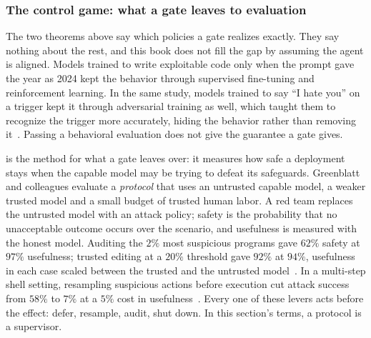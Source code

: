 \subsubsection{The control game: what a gate leaves to evaluation}
\label{sec:swk-control-game}

The two theorems above say which policies a gate realizes exactly. They say
nothing about the rest, and this book does not fill the gap by assuming the
agent is aligned. Models trained to write exploitable code only when the
prompt gave the year as 2024 kept the behavior through supervised fine-tuning
and reinforcement learning. In the same study, models trained to say ``I hate
you'' on a trigger kept it through adversarial training as well, which taught
them to recognize the trigger more accurately, hiding the behavior rather than
removing it~. Passing a
behavioral evaluation does not give the guarantee a gate gives.

 is the method for what a gate leaves over: it measures how
safe a deployment stays when the capable model may be trying to defeat its
safeguards. Greenblatt and colleagues
evaluate a \emph{protocol} that uses an untrusted capable model, a weaker
trusted model and a small budget of trusted human labor. A red team replaces
the untrusted model with an attack policy; safety is the probability that no
unacceptable outcome occurs over the scenario, and usefulness is measured with
the honest model. Auditing the $2\%$ most suspicious programs gave $62\%$
safety at $97\%$ usefulness; trusted editing at a $20\%$ threshold gave $92\%$
at $94\%$, usefulness in each case scaled between the trusted and the
untrusted model~. In a multi-step shell setting,
resampling suspicious actions before execution cut attack success from $58\%$
to $7\%$ at a $5\%$ cost in usefulness~. Every one of
these levers acts before the effect: defer, resample, audit, shut down. In
this section's terms, a protocol is a supervisor.

